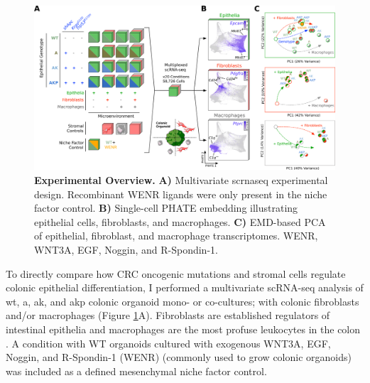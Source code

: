 \begin{figure}
    \centering
    \includegraphics{04seq/figs/4SEQ_ExpDesign.png}
    \caption{\textbf{Experimental Overview.} \textbf{A)} Multivariate \acrshort{scrnaseq} experimental design. Recombinant WENR ligands were only present in the niche factor control. \textbf{B)} Single-cell PHATE embedding illustrating epithelial cells, fibroblasts, and macrophages. \textbf{C)} EMD-based PCA of epithelial, fibroblast, and macrophage transcriptomes. WENR, WNT3A, EGF, Noggin, and R-Spondin-1.}
    \label{fig:4exp}
\end{figure}

To directly compare how CRC oncogenic mutations and stromal cells regulate colonic epithelial differentiation, I performed a multivariate scRNA-seq analysis of \acrfull{wt}, \acrfull{a}, \acrfull{ak}, and \acrfull{akp} colonic organoid mono- or co-cultures; with colonic fibroblasts and/or macrophages (Figure \ref{fig:4exp}A). Fibroblasts are established regulators of intestinal epithelia \cite{roulis_fibroblasts_2016} and macrophages are the most profuse leukocytes in the colon \cite{isidro_colonic_2016}. A condition with WT organoids cultured with exogenous WNT3A, EGF, Noggin, and R-Spondin-1 (WENR) (commonly used to grow colonic organoids) was included as a defined mesenchymal niche factor control. 

